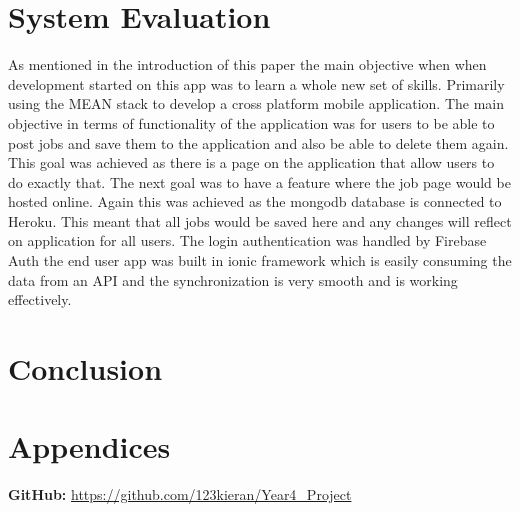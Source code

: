 \chapter{System Evaluation}
As mentioned in the introduction of this paper the main objective when when development started on this app was to learn a whole new set of skills. Primarily using the MEAN stack to develop a cross platform mobile application. The main objective in terms of functionality of the application was for users to be able to post jobs and save them to the application and also be able to delete them again. This goal was achieved as there is a page on the application that allow users to do exactly that. The next goal was to have a feature where the job page would be hosted online. Again this was achieved  as the mongodb database is connected to Heroku. This meant that all jobs would be saved here and any changes will reflect on application for all users. The login authentication was handled by Firebase Auth the end user app was built in ionic framework which is easily consuming the data from an API and the synchronization is very smooth and is working effectively. 

\chapter{Conclusion}


\chapter{Appendices}
\textbf {GitHub: } \url{https://github.com/123kieran/Year4_Project}